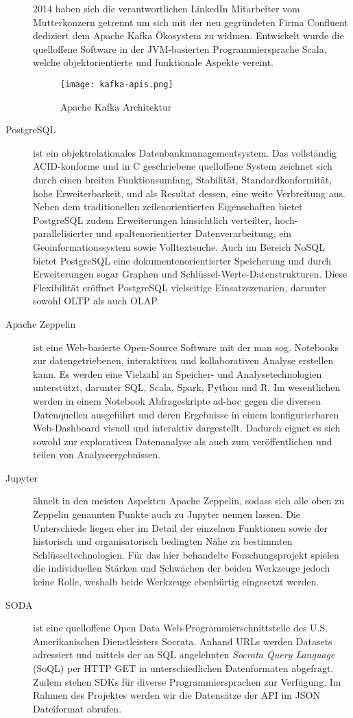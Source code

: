 \begin{description}
	2014 haben sich die verantwortlichen LinkedIn Mitarbeiter vom Mutterkonzern getrennt um sich mit der neu gegründeten Firma Confluent dediziert dem Apache Kafka Ökosystem zu widmen. Entwickelt wurde die quelloffene Software in der JVM-basierten Programmiersprache Scala, welche objektorientierte und funktionale Aspekte vereint.
	\begin{figure}[h]
		\centering
		\texttt{[image: kafka-apis.png]}
		\caption[Apache Kafka Architektur]{Apache Kafka Architektur\citep{TODO}}
		\label{fig:KafkaArchitecture}
	\end{figure}
	\item [PostgreSQL] ist ein objektrelationales Datenbankmanagementsystem. Das vollständig ACID-konforme und in C geschriebene quelloffene System zeichnet sich durch einen breiten Funktionsumfang, Stabilität, Standardkonformität, hohe Erweiterbarkeit, und als Resultat dessen, eine weite Verbreitung aus. Neben dem traditionellen zeilenorientierten  Eigenschaften bietet PostgreSQL zudem Erweiterungen hinsichtlich verteilter, hoch-parallelisierter und  spaltenorientierter Datenverarbeitung, ein Geoinformationssystem sowie Volltextsuche. Auch im Bereich NoSQL bietet PostgreSQL eine dokumentenorientierter Speicherung und durch Erweiterungen sogar Graphen und Schlüssel-Werte-Datenstrukturen. Diese Flexibilität eröffnet PostgreSQL vielseitige Einsatzszenarien, darunter sowohl OLTP als auch OLAP.
	\item [Apache Zeppelin] ist eine Web-basierte Open-Source Software mit der man sog. Notebooks zur datengetriebenen, interaktiven und kollaborativen Analyse erstellen kann. Es werden eine Vielzahl an Speicher- und Analysetechnologien unterstützt, darunter SQL, Scala, Spark, Python und R. Im wesentlichen werden in einem Notebook Abfrageskripte ad-hoc gegen die diversen Datenquellen ausgeführt und deren Ergebnisse in einem konfigurierbaren Web-Dashboard visuell und interaktiv dargestellt. Dadurch eignet es sich sowohl zur explorativen Datenanalyse als auch zum veröffentlichen und teilen von Analyseergebnissen.
	\item [Jupyter] ähnelt in den meisten Aspekten Apache Zeppelin, sodass sich alle oben zu Zeppelin genannten Punkte auch zu Jupyter nennen lassen. Die Unterschiede liegen eher im Detail der einzelnen Funktionen sowie der historisch und organisatorisch bedingten Nähe zu bestimmten Schlüsseltechnologien. Für das hier behandelte Forschungsprojekt spielen die individuellen Stärken und Schwächen der beiden Werkzeuge jedoch keine Rolle, weshalb beide Werkzeuge ebenbürtig eingesetzt werden.
	\item[\ac{SODA}] ist eine quelloffene Open Data Web-Programmierschnittstelle des U.S. Amerikanischen Dienstleisters Socrata. Anhand URLs werden Datasets adressiert und mittels der an SQL angelehnten \textit{Socrata Query Language} (SoQL) per HTTP GET in unterschiedlichen Datenformaten abgefragt. Zudem stehen SDKs für diverse Programmiersprachen zur Verfügung. Im Rahmen des Projektes werden wir die Datensätze der \ac{API} im \ac{JSON} Dateiformat abrufen.
\end{description}
